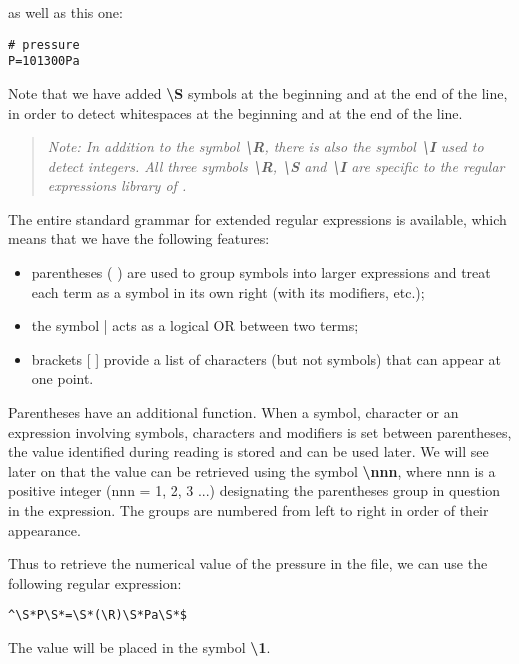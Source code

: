 as well as this one:
\lstset{language=C++, basicstyle=\normalsize}
\begin{lstlisting}[frame=TBRL]
# pressure
P=101300Pa
\end{lstlisting}

Note that we have added {\bf \textbackslash S} symbols at the beginning and at the end of the line, in order to detect whitespaces at the beginning and at the end of the line.

\small
\begin{quote}
\textit{Note: In addition to the symbol {\bf \textbackslash R}, there is also the symbol {\bf \textbackslash I} used to detect integers. All three symbols {\bf \textbackslash R}, {\bf \textbackslash S} and {\bf \textbackslash I} are specific to the regular expressions library of \OT.}
\end{quote}
\normalsize

The entire standard grammar for extended regular expressions is available, which means that we have the following features:
\begin{itemize}
\item parentheses ( ) are used to group symbols into larger expressions and treat each term as a symbol in its own right (with its modifiers, etc.);
\item the symbol | acts as a logical OR between two terms;
\item brackets [ ] provide a list of characters (but not symbols) that can appear at one point.
\end{itemize}

Parentheses have an additional function. When a symbol, character or an expression involving symbols, characters and modifiers is set between parentheses, the value identified during reading is stored and can be used later. We will see later on that the value can be retrieved using the symbol {\bf \textbackslash nnn}, where nnn is a positive integer (nnn = 1, 2, 3 ...) designating the parentheses group in question in the expression. The groups are numbered from left to right in order of their appearance.

Thus to retrieve the numerical value of the pressure in the file, we can use the following regular expression:
\lstset{language=C++, basicstyle=\normalsize}
\begin{lstlisting}[frame=TBRL]
^\S*P\S*=\S*(\R)\S*Pa\S*$
\end{lstlisting}

The value will be placed in the symbol {\bf \textbackslash 1}.

